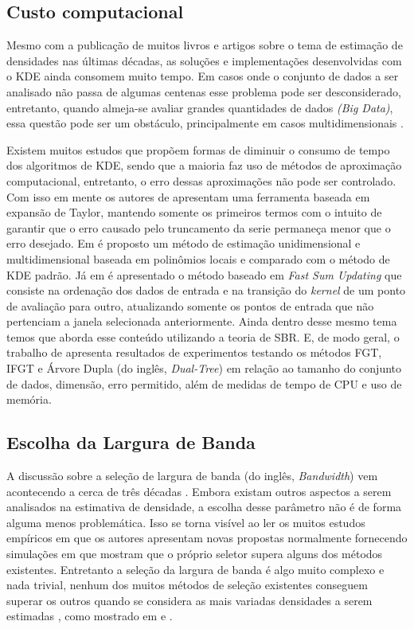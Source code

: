 \subsection{Custo computacional}

Mesmo com a publicação de muitos livros e artigos sobre o tema de estimação de densidades nas últimas décadas, as soluções e implementações desenvolvidas com o \ac{KDE} ainda consomem muito tempo. Em casos onde o conjunto de dados a ser analisado não passa de algumas centenas esse problema pode ser desconsiderado, entretanto, quando almeja-se avaliar grandes quantidades de dados \textit{(Big Data)}, essa questão pode ser um obstáculo, principalmente em casos multidimensionais \cite{gramacki2017nonparametric}.

Existem muitos estudos que propõem formas de diminuir o consumo de tempo dos algoritmos de \ac{KDE}, sendo que a maioria faz uso de métodos de aproximação computacional, entretanto, o erro dessas aproximações não pode ser controlado. Com isso em mente os autores de \cite{raykar2010fast} apresentam uma ferramenta baseada em expansão de Taylor, mantendo somente os primeiros termos com o intuito de garantir que o erro causado pelo truncamento da serie permaneça menor que o erro desejado. Em \cite{tang2016fast} é proposto um método de estimação unidimensional e multidimensional baseada em polinômios locais e comparado com o método de \ac{KDE} padrão. Já em \cite{langrene2017fast} é apresentado o método baseado em \textit{Fast Sum Updating} que consiste na ordenação dos dados de entrada e na transição do \textit{kernel} de um ponto de avaliação para outro, atualizando somente os pontos de entrada que não pertenciam a janela selecionada anteriormente. Ainda dentro desse mesmo tema temos \cite{yin2008fast} que aborda esse conteúdo utilizando a teoria de \ac{SBR}. E, de modo geral, o trabalho de \cite{lang2005empirical} apresenta resultados de experimentos testando os métodos \ac{FGT}, \ac{IFGT} e Árvore Dupla (do inglês, \textit{Dual-Tree}) em relação ao tamanho do conjunto de dados, dimensão, erro permitido, além de medidas de tempo de CPU e uso de memória.

\subsection{Escolha da Largura de Banda}

A discussão sobre a seleção de largura de banda (do inglês, \textit{Bandwidth}) vem acontecendo a cerca de três décadas \cite{heidenreich2013bandwidth}. Embora existam outros aspectos a serem analisados na estimativa de densidade, a escolha desse parâmetro não é de forma alguma menos problemática. Isso se torna visível ao ler os muitos estudos empíricos em que os autores apresentam novas propostas normalmente fornecendo simulações em que mostram que o próprio seletor supera alguns dos métodos existentes. Entretanto a seleção da largura de banda é algo muito complexo e nada trivial, nenhum dos muitos métodos de seleção existentes conseguem superar os outros quando se considera as mais variadas densidades a serem estimadas , como mostrado em \cite{heidenreich2013bandwidth} e \cite{turlach1993bandwidth}.

